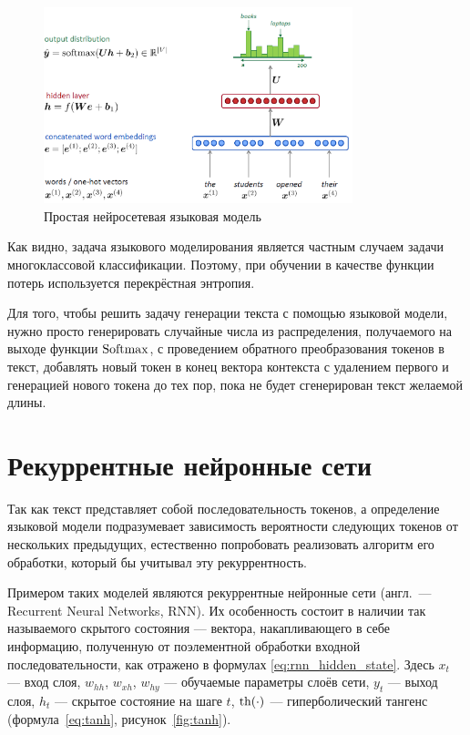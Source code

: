 \begin{figure}[h]
    \centering
    \includegraphics[width=0.8\textwidth]{../inc/images/language_model.png}
    \caption{Простая нейросетевая языковая модель}
    \label{fig:lang_model}
\end{figure}

Как видно, задача языкового моделирования является частным случаем задачи многоклассовой классификации. Поэтому, при обучении в качестве функции потерь используется перекрёстная энтропия.

Для того, чтобы решить задачу генерации текста с помощью языковой модели, нужно просто генерировать случайные числа из распределения, получаемого на выходе функции $\operatorname{Softmax}$, с проведением обратного преобразования токенов в текст, добавлять новый токен в конец вектора контекста с удалением первого и генерацией нового токена до тех пор, пока не будет сгенерирован текст желаемой длины.

\section{Рекуррентные нейронные сети}

Так как текст представляет собой последовательность токенов, а определение языковой модели подразумевает зависимость вероятности следующих токенов от нескольких предыдущих, естественно попробовать реализовать алгоритм его обработки, который бы учитывал эту рекуррентность.

Примером таких моделей являются рекуррентные нейронные сети (англ. --- Recurrent Neural Networks, RNN). Их особенность состоит в наличии так называемого скрытого состояния --- вектора, накапливающего в себе информацию, полученную от поэлементной обработки входной последовательности, как отражено в формулах \ref*{eq:rnn_hidden_state}. Здесь $x_t$ --- вход слоя, $w_{hh}$, $w_{xh}$, $w_{hy}$ --- обучаемые параметры слоёв сети, $y_t$ --- выход слоя, $h_t$ --- скрытое состояние на шаге $t$, $\operatorname{th}(\cdot)$ --- гиперболический тангенс (формула \ref*{eq:tanh}, рисунок \ref*{fig:tanh}).

